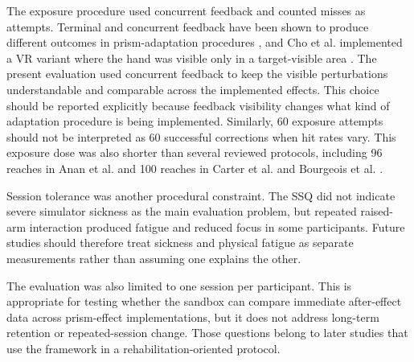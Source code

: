 The exposure procedure used concurrent feedback and counted misses as attempts. Terminal and concurrent feedback have been shown to produce different outcomes in prism-adaptation procedures \cite{Serino2011}, and Cho et al. implemented a VR variant where the hand was visible only in a target-visible area \cite{cho2022feasibility}. The present evaluation used concurrent feedback to keep the visible perturbations understandable and comparable across the implemented effects. This choice should be reported explicitly because feedback visibility changes what kind of adaptation procedure is being implemented. Similarly, 60 exposure attempts should not be interpreted as 60 successful corrections when hit rates vary. This exposure dose was also shorter than several reviewed protocols, including 96 reaches in Anan et al. and 100 reaches in Carter et al. and Bourgeois et al. \cite{anan2025comparative,Carter2016,Bourgeois2021}.

Session tolerance was another procedural constraint. The SSQ did not indicate severe simulator sickness as the main evaluation problem, but repeated raised-arm interaction produced fatigue and reduced focus in some participants. Future studies should therefore treat sickness and physical fatigue as separate measurements rather than assuming one explains the other.

The evaluation was also limited to one session per participant. This is appropriate for testing whether the sandbox can compare immediate after-effect data across prism-effect implementations, but it does not address long-term retention or repeated-session change. Those questions belong to later studies that use the framework in a rehabilitation-oriented protocol.
